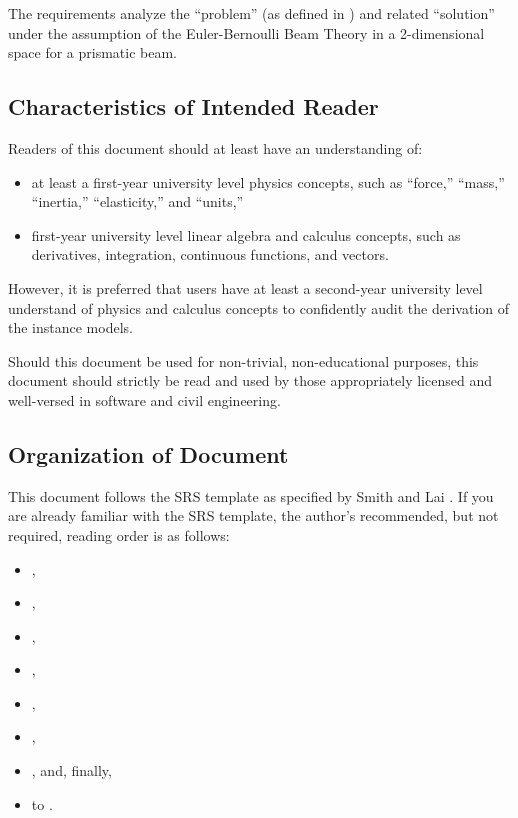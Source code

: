 \documentclass[12pt]{article}
\begin{document}
The requirements analyze the ``problem'' (as defined in ) and
related ``solution'' under the assumption of the Euler-Bernoulli Beam Theory
\cite{EulerBernoulliWiki} in a 2-dimensional space for a prismatic beam.

\subsection{Characteristics of Intended Reader}
\label{sec_IntendedReader}

Readers of this document should at least have an understanding of:
\begin{itemize}
    \item at least a first-year university level physics concepts, such as
          ``force,'' ``mass,'' ``inertia,'' ``elasticity,'' and ``units,''
    \item first-year university level linear algebra and calculus concepts, such
          as derivatives, integration, continuous functions, and vectors.
\end{itemize}

However, it is preferred that users have at least a second-year university level
understand of physics and calculus concepts to confidently audit the derivation
of the instance models.

Should this document be used for non-trivial, non-educational purposes, this
document should strictly be read and used by those appropriately licensed and
well-versed in software and civil engineering.

\subsection{Organization of Document}

This document follows the SRS template as specified by Smith and Lai
\cite{SmithAndLai2005}. If you are already familiar with the SRS template, the
author's recommended, but not required, reading order is as follows:

\begin{itemize}
    \item {},
    \item {},
    \item {},
    \item {},
    \item {},
    \item {},
    \item {}, and, finally,
    \item {} to .
\end{itemize}
\end{document}
